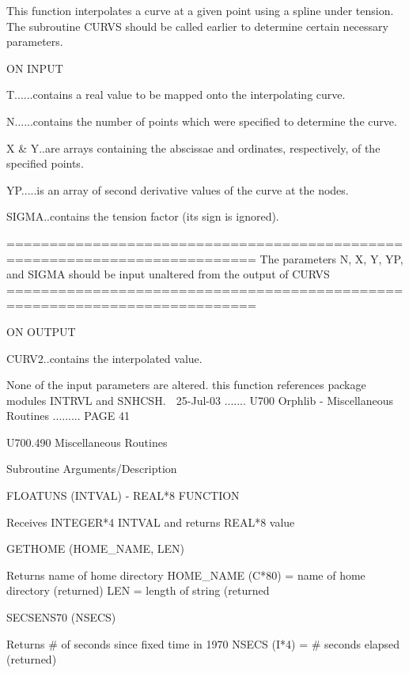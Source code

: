    This function interpolates a curve at a given point using  a  spline  under
   tension.  The  subroutine  CURVS  should  be  called  earlier  to determine
   certain necessary parameters.
 
                                    ON INPUT
 
   T......contains a real value to be mapped onto the interpolating curve.
 
   N......contains the number of points which were specified to determine  the
          curve.
 
   X  & Y..are arrays containing the abscissae and ordinates, respectively, of
          the specified points.
 
   YP.....is an array of second derivative values of the curve at the nodes.
 
   SIGMA..contains the tension factor (its sign is ignored).
 
   ===========================================================================
   The parameters N, X, Y, YP, and SIGMA should be input unaltered from the
   output of CURVS
   ===========================================================================
 
                                    ON OUTPUT
 
   CURV2..contains the interpolated value.
 
   None of the input parameters are altered. this function references  package
   modules INTRVL and SNHCSH.
    
   25-Jul-03 ....... U700  Orphlib - Miscellaneous Routines ......... PAGE  41
 
 
   U700.490  Miscellaneous Routines
 
   Subroutine          Arguments/Description
 
   FLOATUNS           (INTVAL)  -  REAL*8 FUNCTION
 
                       Receives INTEGER*4 INTVAL and returns REAL*8 value
 
 
   GETHOME            (HOME_NAME, LEN)
 
                       Returns name of home directory
                       HOME_NAME (C*80) = name of home directory (returned)
                       LEN              = length of string       (returned
 
 
   SECSENS70          (NSECS)
 
                       Returns # of seconds since fixed time in 1970
                       NSECS (I*4) = # seconds elapsed (returned)
 

